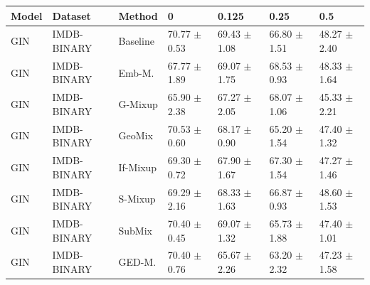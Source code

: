 \begin{table}
\centering
\begin{tabular}{lllllll}
\toprule
\textbf{Model} & \textbf{Dataset} & \textbf{Method} & \textbf{0} & \textbf{0.125} & \textbf{0.25} & \textbf{0.5}\\
\midrule
GIN & IMDB-BINARY & Baseline & 70.77 $\pm$ 0.53 & 69.43 $\pm$ 1.08 & 66.80 $\pm$ 1.51 & 48.27 $\pm$ 2.40\\
GIN & IMDB-BINARY & Emb-M. & 67.77 $\pm$ 1.89 & 69.07 $\pm$ 1.75 & 68.53 $\pm$ 0.93 & 48.33 $\pm$ 1.64\\
GIN & IMDB-BINARY & G-Mixup & 65.90 $\pm$ 2.38 & 67.27 $\pm$ 2.05 & 68.07 $\pm$ 1.06 & 45.33 $\pm$ 2.21\\
GIN & IMDB-BINARY & GeoMix & 70.53 $\pm$ 0.60 & 68.17 $\pm$ 0.90 & 65.20 $\pm$ 1.54 & 47.40 $\pm$ 1.32\\
GIN & IMDB-BINARY & If-Mixup & 69.30 $\pm$ 0.72 & 67.90 $\pm$ 1.67 & 67.30 $\pm$ 1.54 & 47.27 $\pm$ 1.46\\
GIN & IMDB-BINARY & S-Mixup & 69.29 $\pm$ 2.16 & 68.33 $\pm$ 1.63 & 66.87 $\pm$ 0.93 & 48.60 $\pm$ 1.53\\
GIN & IMDB-BINARY & SubMix & 70.40 $\pm$ 0.45 & 69.07 $\pm$ 1.32 & 65.73 $\pm$ 1.88 & 47.40 $\pm$ 1.01\\
GIN & IMDB-BINARY & GED-M. & 70.40 $\pm$ 0.76 & 65.67 $\pm$ 2.26 & 63.20 $\pm$ 2.32 & 47.23 $\pm$ 1.58\\
\bottomrule
\end{tabular}
\end{table}
